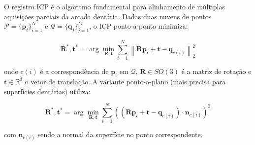 O registro ICP é o algoritmo fundamental para alinhamento de múltiplas aquisições parciais da arcada dentária. Dadas duas nuvens de pontos $\mathcal{P} = \{ \mathbf{p}_i \}_{i=1}^{N}$ e $\mathcal{Q} = \{ \mathbf{q}_j \}_{j=1}^{M}$, o ICP ponto-a-ponto minimiza:

\begin{equation}
\label{eq:icp-ponto-ponto}
\mathbf{R}^*, \mathbf{t}^* = \arg\min_{\mathbf{R}, \mathbf{t}} \sum_{i=1}^{N} \left\| \mathbf{R} \mathbf{p}_i + \mathbf{t} - \mathbf{q}_{c(i)} \right\|_2^2
\end{equation}

onde $c(i)$ é a correspondência de $\mathbf{p}_i$ em $\mathcal{Q}$, $\mathbf{R} \in SO(3)$ é a matriz de rotação e $\mathbf{t} \in \mathbb{R}^3$ o vetor de translação. A variante ponto-a-plano (mais precisa para superfícies dentárias) utiliza:

\begin{equation}
\label{eq:icp-ponto-plano}
\mathbf{R}^*, \mathbf{t}^* = \arg\min_{\mathbf{R}, \mathbf{t}} \sum_{i=1}^{N} \left( (\mathbf{R} \mathbf{p}_i + \mathbf{t} - \mathbf{q}_{c(i)}) \cdot \mathbf{n}_{c(i)} \right)^2
\end{equation}

com $\mathbf{n}_{c(i)}$ sendo a normal da superfície no ponto correspondente.

